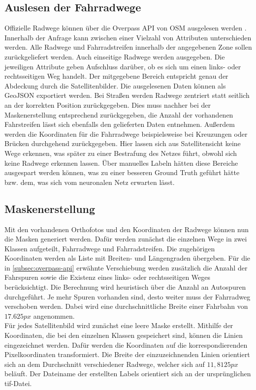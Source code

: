 \subsection{Auslesen der Fahrradwege} \label{subsec:overpass-api}

Offizielle Radwege können über die Overpass API von \ac{OSM} ausgelesen werden \cite{.05.10.2021}.
Innerhalb der Anfrage kann zwischen einer Vielzahl von Attributen unterschieden werden.
Alle Radwege und Fahrradstreifen innerhalb der angegebenen Zone sollen zurückgeliefert werden.
Auch einseitige Radwege werden ausgegeben. 
Die jeweiligen Attribute geben Aufschluss darüber, ob es sich um einen links- oder rechtsseitigen Weg handelt.
Der mitgegebene Bereich entspricht genau der Abdeckung durch die Satellitenbilder.
Die ausgelesenen Daten können als GeoJSON exportiert werden.
Bei Straßen werden Radwege zentriert statt seitlich an der korrekten Position zurückgegeben.
Dies muss nachher bei der Maskenerstellung entsprechend zurückgegeben, die Anzahl der vorhandenen Fahrstreifen lässt sich ebenfalls den gelieferten Daten entnehmen.
Außerdem werden die Koordinaten für die Fahrradwege beispielsweise bei Kreuzungen oder Brücken durchgehend zurückgegeben. 
Hier lassen sich aus Satellitensicht keine Wege erkennen, was später zu einer Bestrafung des Netzes führt, obwohl sich keine Radwege erkennen lassen.
Über manuelles Labeln hätten diese Bereiche ausgespart werden können, was zu einer besseren Ground Truth geführt hätte bzw. dem, was sich vom neuronalen Netz erwarten lässt.

\subsection{Maskenerstellung}

Mit den vorhandenen Orthofotos und den Koordinaten der Radwege können nun die Masken generiert werden.
Dafür werden zunächst die einzelnen Wege in zwei Klassen aufgeteilt, Fahrradwege und Fahrradstreifen.
Die zugehörigen Koordinaten werden als Liste mit Breiten- und Längengraden übergeben.
Für die in \autoref{subsec:overpass-api} erwähnte Verschiebung werden zusätzlich die Anzahl der Fahrspuren sowie die Existenz eines links- oder rechtsseitigen Weges berücksichtigt.
Die Berechnung wird heuristisch über die Anzahl an Autospuren durchgeführt.
Je mehr Spuren vorhanden sind, desto weiter muss der Fahrradweg verschoben werden.
Dabei wird eine durchschnittliche Breite einer Fahrbahn von $17.625px$ angenommen.\\
Für jedes Satellitenbild wird zunächst eine leere Maske erstellt.
Mithilfe der Koordinaten, die bei den einzelnen Klassen gespeichert sind, können die Linien eingezeichnet werden.
Dafür werden die Koordinaten auf die korrespondierenden Pixelkoordinaten transformiert.
Die Breite der einzuzeichnenden Linien orientiert sich an dem Durchschnitt verschiedener Radwege, welcher sich auf $11,8125px$ beläuft.
Der Dateiname der erstellten Labels orientiert sich an der ursprünglichen tif-Datei.

